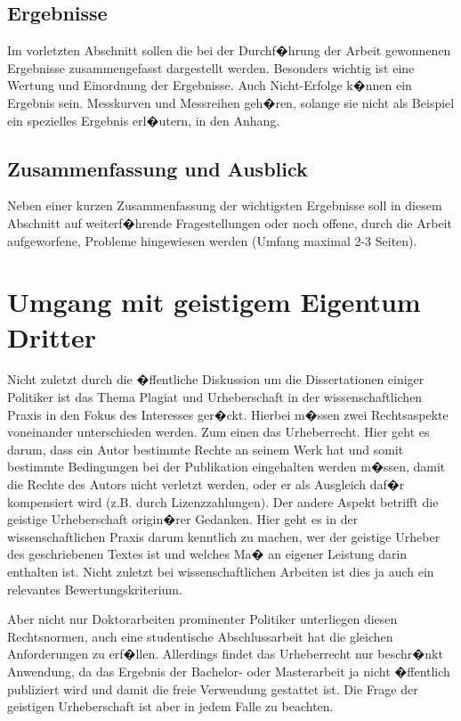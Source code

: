 \subsection{Ergebnisse\label{sec:ergebnisse}}
Im vorletzten Abschnitt sollen die bei der Durchf�hrung der Arbeit gewonnenen Ergebnisse
zusammengefasst dargestellt werden. Besonders wichtig ist eine Wertung und Einordnung der
Ergebnisse. Auch Nicht-Erfolge k�nnen ein Ergebnis sein. Messkurven und Messreihen geh�ren, solange
sie nicht als Beispiel ein spezielles Ergebnis erl�utern, in den Anhang.

\subsection{Zusammenfassung und Ausblick}
Neben einer kurzen Zusammenfassung der wichtigsten Ergebnisse soll in diesem Abschnitt auf
weiterf�hrende Fragestellungen oder noch offene, durch die Arbeit aufgeworfene, Probleme
hingewiesen werden (Umfang maximal 2-3 Seiten).


\section{Umgang mit geistigem Eigentum Dritter}

Nicht zuletzt durch die �ffentliche Diskussion um die Dissertationen einiger Politiker ist das Thema Plagiat und Urheberschaft in der wissenschaftlichen Praxis in den Fokus des Interesses ger�ckt. Hierbei m�ssen zwei Rechtsaspekte voneinander unterschieden werden. Zum einen das Urheberrecht. Hier geht es darum, dass ein Autor bestimmte Rechte an seinem Werk hat und somit bestimmte Bedingungen bei der Publikation eingehalten werden m�ssen, damit die Rechte des Autors nicht verletzt werden, oder er als Ausgleich daf�r kompensiert wird (z.B. durch Lizenzzahlungen).
Der andere Aspekt betrifft die geistige Urheberschaft origin�rer Gedanken. Hier geht es in der wissenschaftlichen Praxis darum kenntlich zu machen, wer der geistige Urheber des geschriebenen Textes ist und welches Ma� an eigener Leistung darin enthalten ist. Nicht zuletzt bei wissenschaftlichen Arbeiten ist dies ja auch ein relevantes Bewertungskriterium.

Aber nicht nur Doktorarbeiten prominenter Politiker unterliegen diesen Rechtsnormen, auch eine studentische Abschlussarbeit hat die gleichen Anforderungen zu erf�llen. Allerdings findet das Urheberrecht nur beschr�nkt Anwendung, da das Ergebnis der Bachelor- oder Masterarbeit ja nicht �ffentlich publiziert wird und damit die freie Verwendung gestattet ist. Die Frage der geistigen Urheberschaft ist aber in jedem Falle zu beachten.

